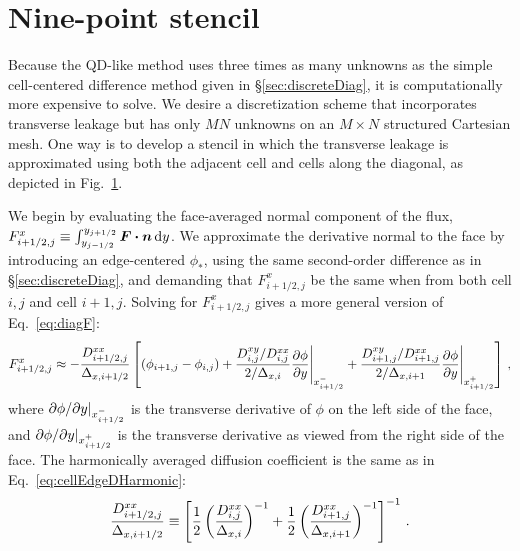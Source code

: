 \section{Nine-point stencil}

Because the QD-like method uses three times as many unknowns as the simple
cell-centered difference method given in \S\ref{sec:discreteDiag}, it is
computationally more expensive to solve. We desire a discretization scheme that
incorporates transverse leakage but has only $MN$ unknowns on an $M\times N$
structured Cartesian mesh. One way is to develop a stencil in which the
transverse
leakage is approximated using both the adjacent cell and cells along the
diagonal, as depicted in Fig.~\ref{fig:anisoStencils}.

\begin{figure}[b]
  \centering
  \label{fig:anisoStencils}
\end{figure}

We begin by evaluating the face-averaged normal component of the flux,
$F_{i+1/2,j}^x \equiv \int_{y_{j-1/2}}^{y_{j+1/2}} \bm{F} \bm{\cdot} \bm{n} \mathop{}\!\mathrm{d}
y$. We approximate the derivative normal
to the face by introducing an edge-centered $\phi_*$, using the same second-order
difference as in \S\ref{sec:discreteDiag}, and demanding that $F_{i+1/2,j}^x$ be
the same when from both cell $i,j$ and cell $i+1,j$.
Solving for $F_{i+1/2,j}^x$ gives a more general version of
Eq.~\eqref{eq:diagF}:
\begin{equation} \label{eq:cellAnisoFlux}
  F_{i+1/2,j}^{x} \approx
  - \frac{D^{xx}_{i+1/2,j}}{\Delta_{x,i+1/2}}
  \left[ 
    \left( \phi_{i+1,j} - \phi_{i,j} \right)
  + \frac{D^{xy}_{i,j}/D^{xx}_{i,j}}{2/\Delta_{x,i}}
    \frac{\partial \phi}{\partial y} \Bigg|_{x_{i+1/2}^-}
  + \frac{D^{xy}_{i+1,j}/D^{xx}_{i+1,j}}{2/\Delta_{x,i+1}}
    \frac{\partial \phi}{\partial y} \Bigg|_{x_{i+1/2}^+}
  \right]\,,
\end{equation}
where ${\partial \phi}/{\partial y} |_{x_{i+1/2}^-}$ is the transverse derivative of
$\phi$ on the left side of the face, and ${\partial \phi}/{\partial y} |_{x_{i+1/2}^+}$ is
the transverse derivative as viewed from the right side of the face.
The harmonically averaged diffusion coefficient is the same as in
Eq.~\eqref{eq:cellEdgeDHarmonic}:
\begin{equation*}
  \frac{D^{xx}_{i+1/2,j}}{\Delta_{x,i+1/2}} \equiv \left[
  \frac12 \left( \frac{D^{xx}_{i,j}}{\Delta_{x,i}} \right)^{-1}
 + \frac12 \left( \frac{D^{xx}_{i+1,j}}{\Delta_{x,i+1}} \right)^{-1}
  \right]^{-1}\,.
\end{equation*}

